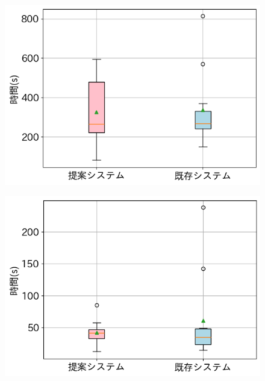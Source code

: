 \begin{figure}[h]
 \begin{minipage}[b]{0.48\linewidth}
  \centering
  \includegraphics[scale=0.4]{./imgs/result/cakeAllTime.png}
        \label{fig:exp1AllTime}
 \end{minipage}
 \begin{minipage}[b]{0.48\linewidth}
  \centering
  \includegraphics[scale=0.4]{./imgs/result/cakeStepTime.png}
 \end{minipage}\\
 \begin{minipage}[b]{0.48\linewidth}
  \centering

\end{minipage}
\end{figure}
